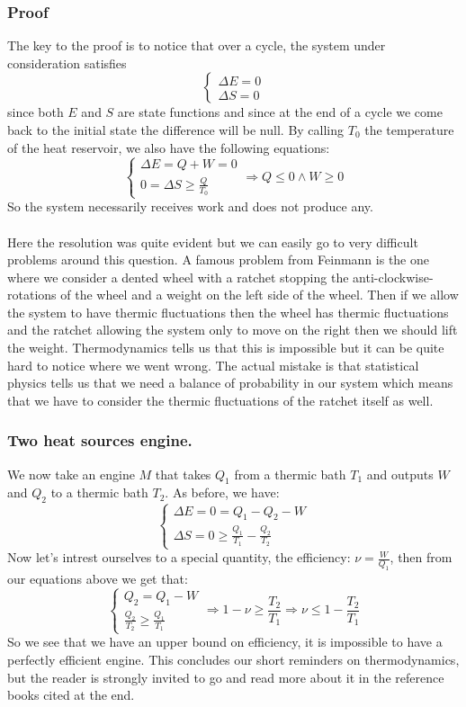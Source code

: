 \documentclass[10pt,a4paper]{book}
\begin{document}
\subsubsection{Proof}
The key to the proof is to notice that over a cycle, the system under consideration satisfies
\[
\begin{cases}
\Delta E = 0\\
\Delta S = 0
\end{cases}
\]
since both $E$ and $S$ are state functions and since at the end of a cycle we come back to the initial state the difference will be null. By calling $T_0$ the temperature of the heat reservoir, we also have the following equations:
\[
\begin{cases}
\Delta E = Q + W = 0\\
0 = \Delta S \geq  \frac{Q}{T_0}
\end{cases} \Rightarrow Q \leq 0 \land W \geq 0
\]
So the system necessarily receives work and does not produce any. \\\\
Here the resolution was quite evident but we can easily go to very difficult problems around this question. A famous problem from Feinmann is the one where we consider a dented wheel with a ratchet stopping the anti-clockwise-rotations of the wheel and a weight on the left side of the wheel. Then if we allow the system to have thermic fluctuations then the wheel has thermic fluctuations and the ratchet allowing the system only to move on the right then we should lift the weight. Thermodynamics tells us that this is impossible but it can be quite hard to notice where we went wrong. The actual mistake is that statistical physics tells us that we need a balance of probability in our system which means that we have to consider the thermic fluctuations of the ratchet itself as well.

\subsubsection{Two heat sources engine.}
We now take an engine $M$ that takes $Q_1$ from a thermic bath $T_1$ and outputs $W$ and $Q_2$ to a thermic bath $T_2$. As before, we have:
\[
\begin{cases}
\Delta E = 0 = Q_1 - Q_2 - W\\
\Delta S = 0 \geq \frac{Q_1}{T_1} - \frac{Q_2}{T_2}
\end{cases}
\]
Now let's intrest ourselves to a special quantity, the efficiency: $\nu = \frac{W}{Q_1}$, then from our equations above we get that:
\[
\begin{cases}
Q_2 = Q_1 - W\\
\frac{Q_2}{T_2} \geq  \frac{Q_1}{T_1}
\end{cases}
\Rightarrow 1 - \nu \geq \frac{T_2}{T_1} \Rightarrow \nu \leq 1 - \frac{T_2}{T_1}
\]
So we see that we have an upper bound on efficiency, it is impossible to have a perfectly efficient engine. This concludes our short reminders on thermodynamics, but the reader is strongly invited to go and read more about it in the reference books cited at the end.
\end{document}

